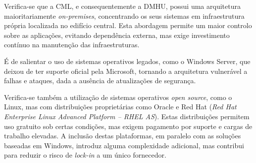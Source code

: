 \documentclass[12pt,a4paper,final]{article}
\begin{document}
    Verifica-se que a CML, e consequentemente a DMHU, possui uma arquitetura maioritariamente \textit{on-premises}, concentrando os seus sistemas em infraestrutura própria localizada no edifício central.
    Esta abordagem permite um maior controlo sobre as aplicações, evitando dependência externa, mas exige investimento contínuo na manutenção das infraestruturas.

    É de salientar o uso de sistemas operativos legados, como o Windows Server, que deixou de ter suporte oficial
    pela Microsoft, tornando a arquitetura vulnerável a falhas e ataques, dada a ausência de atualizações de
    segurança. ~\cite{microsoft2023}

    Verifica-se também a utilização de sistemas operativos \textit{open source}, como o Linux, mas com distribuições proprietárias como Oracle e Red Hat (\textit{Red Hat Enterprise Linux Advanced Platform – RHEL AS}). Estas distribuições permitem uso gratuito sob certas condições, mas exigem pagamento por suporte e cargas de trabalho elevadas.
    A inclusão destas plataformas, em paralelo com as soluções baseadas em Windows, introduz alguma complexidade adicional, mas contribui para reduzir o risco de \textit{lock-in} a um único fornecedor.

    \newpage
    \printbibliography
\end{document}
